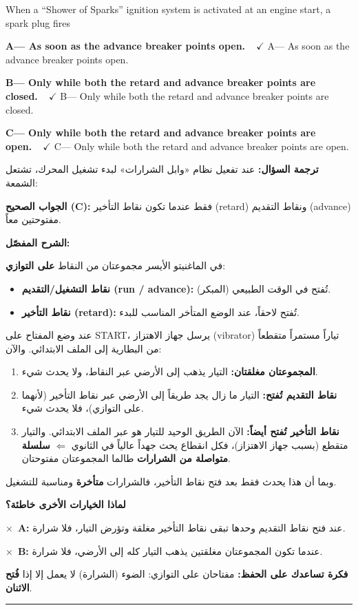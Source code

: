 \documentclass[11pt,a4paper]{article}
\newcommand{\en}[1]{\textenglish{#1}}
\newcommand{\correctletter}{}
\newcommand{\opt}[2]{%
  \ifdefstring{\correctletter}{#1}%
    {\textcolor{ansgreen}{\textbf{#1— #2\ \ $\checkmark$}}}%
    {#1— #2}\par}
\newcommand{\Q}[6]{%
  \renewcommand{\correctletter}{#6}%
  \par\bigskip
  \phantomsection\label{q#1}%
  \begin{tcolorbox}[enhanced,breakable,colback=qback,colframe=qframe,
      arc=2mm,boxrule=0.8pt,fonttitle=\bfseries,
      title={\en{Question #1}}]
    \begin{english}
      #2\par\smallskip
      \opt{A}{#3}\opt{B}{#4}\opt{C}{#5}
    \end{english}
  \end{tcolorbox}}
\newcommand{\tr}[1]{\textbf{\textcolor{qframe}{ترجمة السؤال:}} #1\par}
\newcommand{\ans}[2]{%
  \begin{tcolorbox}[colback=ansback,colframe=ansgreen,boxrule=0.6pt,arc=1.5mm,
      left=4pt,right=4pt,top=2pt,bottom=2pt]
    \textbf{\textcolor{ansgreen}{الجواب الصحيح (\en{#1}):}} #2
  \end{tcolorbox}}
\newcommand{\sharh}[1]{\textbf{\textcolor{conceptc}{الشرح المفصّل:}}\par #1\par}
\newcommand{\nohead}{\textbf{\textcolor{wrongc}{لماذا الخيارات الأخرى خاطئة؟}}\par}
\newcommand{\no}[2]{\hspace*{1em}\textcolor{wrongc}{$\times$}\ \textbf{\en{#1}:} #2\par}
\newcommand{\tip}[1]{%
  \begin{tcolorbox}[colback=tipback,colframe=tipframe,boxrule=0.5pt,arc=1.5mm,
      left=4pt,right=4pt,top=2pt,bottom=2pt]
    \textbf{فكرة تساعدك على الحفظ:} #1
  \end{tcolorbox}}
\newcommand{\qsep}{\par\medskip\noindent\textcolor{qframe!40}{\rule{\linewidth}{0.4pt}}\par}
\begin{document}
\Q{8515}{When a “Shower of Sparks” ignition system is activated at an engine start, a spark plug fires}
{As soon as the advance breaker points open.}
{Only while both the retard and advance breaker points are closed.}
{Only while both the retard and advance breaker points are open.}{C}
\tr{عند تفعيل نظام «وابل الشرارات» لبدء تشغيل المحرك، تشتعل الشمعة:}
\ans{C}{فقط عندما تكون نقاط التأخير (\en{retard}) ونقاط التقديم (\en{advance}) مفتوحتين معاً.}
\sharh{في الماغنيتو الأيسر مجموعتان من النقاط \textbf{على التوازي}:
\begin{itemize}
  \item \textbf{نقاط التشغيل/التقديم (\en{run / advance}):} تُفتح في الوقت الطبيعي (المبكر).
  \item \textbf{نقاط التأخير (\en{retard}):} تُفتح لاحقاً، عند الوضع المتأخر المناسب للبدء.
\end{itemize}
عند وضع المفتاح على \en{START}، يرسل جهاز الاهتزاز (\en{vibrator}) تياراً مستمراً متقطعاً من البطارية إلى الملف الابتدائي. والآن:
\begin{enumerate}[label=\arabic*.]
  \item \textbf{المجموعتان مغلقتان:} التيار يذهب إلى الأرضي عبر النقاط، ولا يحدث شيء.
  \item \textbf{نقاط التقديم تُفتح:} التيار ما زال يجد طريقاً إلى الأرضي عبر نقاط التأخير (لأنهما على التوازي)، فلا يحدث شيء.
  \item \textbf{نقاط التأخير تُفتح أيضاً:} الآن الطريق الوحيد للتيار هو عبر الملف الابتدائي. والتيار متقطع (بسبب جهاز الاهتزاز)، فكل انقطاع يحث جهداً عالياً في الثانوي $\Leftarrow$ \textbf{سلسلة متواصلة من الشرارات} طالما المجموعتان مفتوحتان.
\end{enumerate}
وبما أن هذا يحدث فقط بعد فتح نقاط التأخير، فالشرارات \textbf{متأخرة} ومناسبة للتشغيل.}
\nohead
\no{A}{عند فتح نقاط التقديم وحدها تبقى نقاط التأخير مغلقة وتؤرض التيار، فلا شرارة.}
\no{B}{عندما تكون المجموعتان مغلقتين يذهب التيار كله إلى الأرضي، فلا شرارة.}
\tip{مفتاحان على التوازي: الضوء (الشرارة) لا يعمل إلا إذا \textbf{فُتح الاثنان}.}
\qsep
\end{document}
